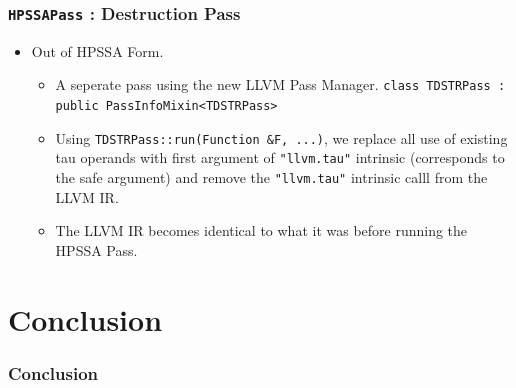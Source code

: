 \documentclass[aspectratio=169, compress]{beamer}
\begin{document}
\begin{frame}
	\frametitle{\texttt{HPSSAPass} : Destruction Pass}
	\begin{itemize}
		\item Out of HPSSA Form. 
		\begin{itemize}
			\item A seperate pass using the new LLVM Pass Manager. \texttt{class TDSTRPass : public PassInfoMixin<TDSTRPass>}
			\item Using \texttt{TDSTRPass::run(Function &F, ...)}, we replace all use of existing tau operands with first argument of  \texttt{"llvm.tau"} intrinsic (corresponds to the safe argument) and remove the \texttt{"llvm.tau"} intrinsic calll from the LLVM IR.
			\item The LLVM IR becomes identical to what it was before running the HPSSA Pass. 
		\end{itemize}
	\end{itemize}
\end{frame}

\footnotesize

\section{Conclusion}
\begin{frame}
	\frametitle{Conclusion}
\end{frame}
\footnotesize
\end{document}
